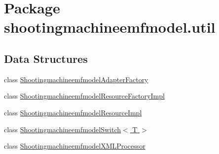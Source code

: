 \hypertarget{namespaceshootingmachineemfmodel_1_1util}{\section{Package shootingmachineemfmodel.\-util}
\label{namespaceshootingmachineemfmodel_1_1util}
}
\subsection*{Data Structures}
\begin{DoxyCompactItemize}
\item 
class \hyperlink{classshootingmachineemfmodel_1_1util_1_1_shootingmachineemfmodel_adapter_factory}{Shootingmachineemfmodel\-Adapter\-Factory}
\item 
class \hyperlink{classshootingmachineemfmodel_1_1util_1_1_shootingmachineemfmodel_resource_factory_impl}{Shootingmachineemfmodel\-Resource\-Factory\-Impl}
\item 
class \hyperlink{classshootingmachineemfmodel_1_1util_1_1_shootingmachineemfmodel_resource_impl}{Shootingmachineemfmodel\-Resource\-Impl}
\item 
class \hyperlink{classshootingmachineemfmodel_1_1util_1_1_shootingmachineemfmodel_switch_3_01_t_01_4}{Shootingmachineemfmodel\-Switch$<$ T $>$}
\item 
class \hyperlink{classshootingmachineemfmodel_1_1util_1_1_shootingmachineemfmodel_x_m_l_processor}{Shootingmachineemfmodel\-X\-M\-L\-Processor}
\end{DoxyCompactItemize}
